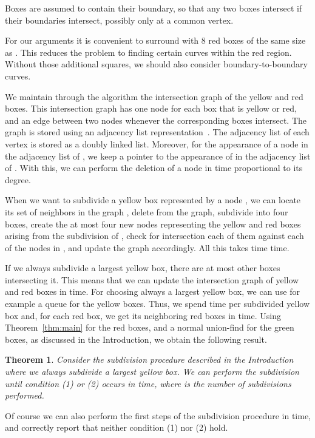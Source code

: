 \documentclass[a4paper,11pt]{article}
\newtheorem{theorem}{Theorem}
\begin{document}
Boxes are assumed to contain their boundary, 
so that any two boxes intersect if their boundaries intersect, 
possibly only at a common vertex.

For our arguments it is convenient to surround  with 8 red boxes of the same size
as . This reduces the problem to finding certain
curves within the red region. Without those additional squares, we should also consider 
boundary-to-boundary curves.

We maintain through the algorithm the intersection graph  of the yellow and red boxes.
This intersection graph  has one node for each box that is yellow or red,
and an edge between two nodes whenever the corresponding boxes intersect.
The graph  is stored using an adjacency list representation~\cite[Chapter 22]{cormen}.
The adjacency list of each vertex is stored as a doubly linked list.
Moreover, for the appearance of a node  in the adjacency list of ,
we keep a pointer to the appearance of  in the adjacency list of .
With this, we can perform the deletion of a node  in time proportional to its
degree.

When we want to subdivide a yellow box  represented by a node , 
we can locate its set of neighbors  in the graph , delete  from
the graph, subdivide  into four boxes, create the at most four new nodes
representing the yellow and red boxes arising from the subdivision of ,
check for intersection each of them against each of the nodes in , 
and update the graph  accordingly. 
All this takes time  time.

If we always subdivide a largest yellow box, there are at most  
other boxes intersecting it. This means that we can update the 
intersection graph  of yellow and red boxes in  time.
For choosing always a largest yellow box, we can use for example a queue
for the yellow boxes.
Thus, we spend  time per subdivided yellow box and,
for each red box, we get its neighboring red boxes in  time.
Using Theorem~\ref{thm:main} for the red boxes, and a normal union-find
for the green boxes, as discussed in the Introduction,
we obtain the following result.

\begin{theorem}
	Consider the subdivision procedure described in the Introduction where
	we always subdivide a largest yellow box.
	We can perform the subdivision until condition (1) or (2) occurs in  time,
	where  is the number of subdivisions performed.	
\end{theorem}

Of course we can also perform the first  steps of the subdivision procedure
in  time, and correctly report that neither condition (1) nor (2) hold.
\end{document}
